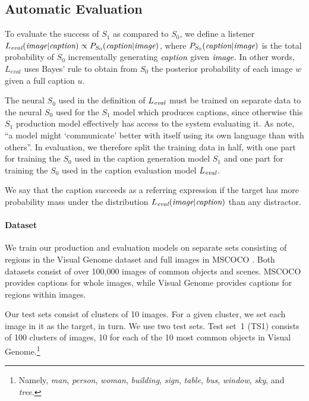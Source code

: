 \documentclass[11pt,a4paper]{article}
\begin{document}
\subsection{Automatic Evaluation}

To evaluate the success of $S_1$  as compared to $S_0$, we define a listener $L_{\emph{eval}}(\emph{image}|\emph{caption}) \propto P_{S_0}(\emph{caption}|\emph{image})$, where $P_{S_0}(\emph{caption}|\emph{image})$ is the total probability of $S_0$ incrementally generating $\emph{caption}$ given $\emph{image}$. In other words, $L_{\mathit{eval}}$ uses Bayes' rule to obtain from $S_0$ the posterior probability of each image $w$ given a full caption $u$. 

The neural $S_0$ used in the definition of $L_{\emph{eval}}$ must be trained on separate data to the neural $S_0$ used for the $S_1$ model which produces captions, since otherwise this $S_1$ production model effectively has access to the system evaluating it. As \citet{backprop} note, ``a model might `communicate' better with itself using its own language than with others''. In evaluation, we therefore split the training data in half, with one part for training the $S_0$ used in the caption generation model $S_1$ and one part for training the $S_0$ used in the caption evaluation model $L_{\emph{eval}}$.

We say that the caption succeeds as a referring expression if the target has more probability mass under the distribution $L_{\emph{eval}}(\emph{image}|\emph{caption})$ than any distractor.

\paragraph{Dataset} We train our production and evaluation models on separate sets consisting of regions in the Visual Genome dataset \cite{krishnavisualgenome} and full images in MSCOCO \cite{mscoco}. Both datasets consist of over 100,000 images of common objects and scenes. MSCOCO provides captions for whole images, while Visual Genome provides captions for regions within images.

Our test sets consist of clusters of 10 images. For a given cluster, we set each image in it as the target, in turn. We use two test sets. Test set~1 (TS1) consists of 100 clusters of images, 10 for each of the 10 most common objects in Visual Genome.\footnote{Namely, \emph{man}, \emph{person}, \emph{woman}, \emph{building}, \emph{sign}, \emph{table}, \emph{bus}, \emph{window}, \emph{sky}, and \emph{tree}.}
\end{document}
